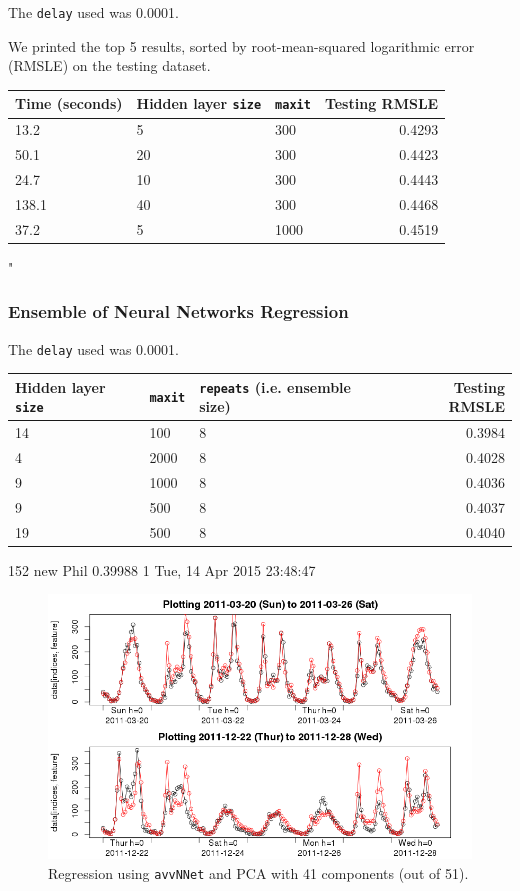 \documentclass[12pt]{article}
\begin{document}
The \texttt{delay} used was 0.0001.

We printed the top 5 results, sorted by root-mean-squared logarithmic error (RMSLE) on the testing dataset.

\begin{table}[H]
	\centering
	\begin{tabular}{lllr}
		Time (seconds) & Hidden layer \texttt{size} & \texttt{maxit} & Testing RMSLE \\
		\hline
		13.2 & 5 & 300 & 0.4293\\
		50.1 & 20 & 300 & 0.4423\\
		24.7 & 10 & 300 & 0.4443\\
		138.1 & 40 & 300 & 0.4468\\
		37.2 & 5 & 1000 & 0.4519\\
	\end{tabular}
\end{table}
"
\subsubsection{Ensemble of Neural Networks Regression}

The \texttt{delay} used was 0.0001.

\begin{table}[H]
	\centering
	\begin{tabular}{lllr}
		Hidden layer \texttt{size} & \texttt{maxit} & \texttt{repeats} (i.e. ensemble size) & Testing RMSLE \\
		\hline
		14 & 100 & 8 & 0.3984\\
		4 & 2000 & 8 & 0.4028\\
		9 & 1000 & 8 & 0.4036\\
		9 & 500 & 8 & 0.4037\\
		19 & 500 & 8 & 0.4040\\
	\end{tabular}
\end{table}

152	new	Phil	
0.39988
1	Tue, 14 Apr 2015 23:48:47

\begin{figure}[H]
	\centering
	\includegraphics[width=.98\textwidth]{figures/regression_pca_hsize14_maxit1000_numpcs41.png}
	\caption{Regression using \texttt{avvNNet} and PCA with 41 components (out of 51).}
\end{figure}
\end{document}
